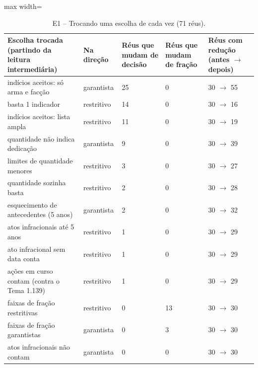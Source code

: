 \begin{table}[h]
\centering\small
\caption{E1 -- Trocando uma escolha de cada vez (71 réus).}
\label{tab:e1b}
\begin{adjustbox}{max width=\textwidth}
\begin{tabular}{p{5.6cm}lp{1.9cm}p{1.9cm}p{2.4cm}}
\toprule
Escolha trocada (partindo da leitura intermediária) & Na direção & Réus que mudam de decisão & Réus que mudam de fração & Réus com redução (antes $\to$ depois) \\
\midrule
indícios aceitos: só arma e facção & garantista & 25 & 0 & 30 $\to$ 55 \\
basta 1 indicador & restritivo & 14 & 0 & 30 $\to$ 16 \\
indícios aceitos: lista ampla & restritivo & 11 & 0 & 30 $\to$ 19 \\
quantidade não indica dedicação & garantista & 9 & 0 & 30 $\to$ 39 \\
limites de quantidade menores & restritivo & 3 & 0 & 30 $\to$ 27 \\
quantidade sozinha basta & restritivo & 2 & 0 & 30 $\to$ 28 \\
esquecimento de antecedentes (5 anos) & garantista & 2 & 0 & 30 $\to$ 32 \\
atos infracionais até 5 anos & restritivo & 1 & 0 & 30 $\to$ 29 \\
ato infracional sem data conta & restritivo & 1 & 0 & 30 $\to$ 29 \\
ações em curso contam (contra o Tema 1.139) & restritivo & 1 & 0 & 30 $\to$ 29 \\
faixas de fração restritivas & restritivo & 0 & 13 & 30 $\to$ 30 \\
faixas de fração garantistas & garantista & 0 & 3 & 30 $\to$ 30 \\
atos infracionais não contam & garantista & 0 & 0 & 30 $\to$ 30 \\
\bottomrule
\end{tabular}
\end{adjustbox}
\end{table}
